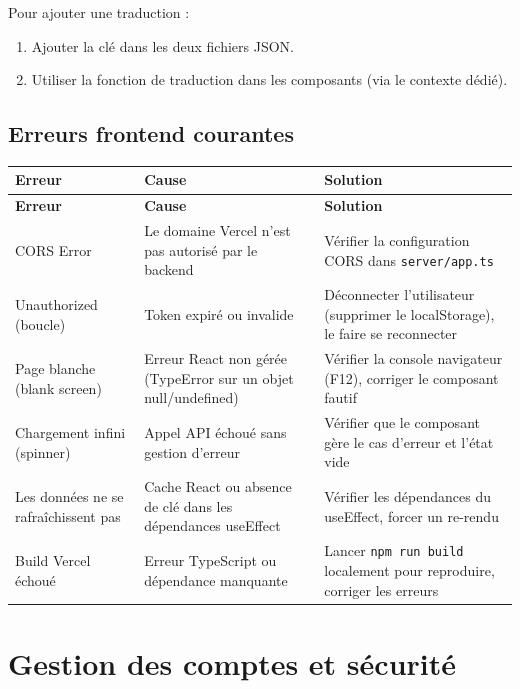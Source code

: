 \documentclass[12pt,a4paper]{report}
\begin{document}
Pour ajouter une traduction :
\begin{enumerate}
    \item Ajouter la clé dans les deux fichiers JSON.
    \item Utiliser la fonction de traduction dans les composants (via le contexte dédié).
\end{enumerate}

\section{Erreurs frontend courantes}

\begin{longtable}{|>{\raggedright\arraybackslash}p{4cm}|>{\raggedright\arraybackslash}p{5cm}|>{\raggedright\arraybackslash}p{5cm}|}
\hline
\textbf{Erreur} & \textbf{Cause} & \textbf{Solution} \\
\hline
\endfirsthead
\hline
\textbf{Erreur} & \textbf{Cause} & \textbf{Solution} \\
\hline
\endhead
CORS Error & Le domaine Vercel n'est pas autorisé par le backend & Vérifier la configuration CORS dans \texttt{server/app.ts} \\
\hline
401 Unauthorized (boucle) & Token expiré ou invalide & Déconnecter l'utilisateur (supprimer le localStorage), le faire se reconnecter \\
\hline
Page blanche (blank screen) & Erreur React non gérée (TypeError sur un objet null/undefined) & Vérifier la console navigateur (F12), corriger le composant fautif \\
\hline
Chargement infini (spinner) & Appel API échoué sans gestion d'erreur & Vérifier que le composant gère le cas d'erreur et l'état vide \\
\hline
Les données ne se rafraîchissent pas & Cache React ou absence de clé dans les dépendances useEffect & Vérifier les dépendances du useEffect, forcer un re-rendu \\
\hline
Build Vercel échoué & Erreur TypeScript ou dépendance manquante & Lancer \texttt{npm run build} localement pour reproduire, corriger les erreurs \\
\hline
\end{longtable}

\chapter{Gestion des comptes et sécurité}
\end{document}
